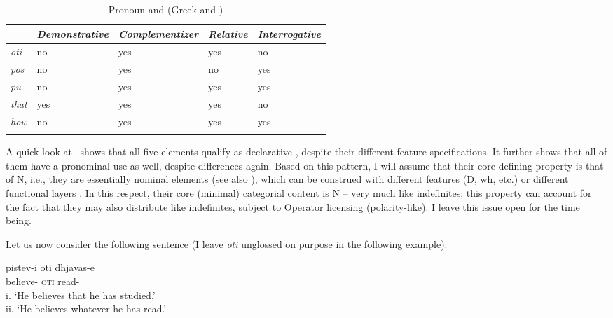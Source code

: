 \documentclass[output=paper]{langsci/langscibook}
\begin{document}
\begin{table}
\begin{tabularx}{\textwidth}{lXXXX}
\lsptoprule
             & \emph{Demonstrative} & \emph{Complementizer} & \emph{Relative} & \emph{Interrogative}\\
\midrule
 \emph{oti}  & no                   & yes                   & yes             & no\\
 \emph{pos}  & no                   & yes                   & no              & yes\\
 \emph{pu}   & no                   & yes                   & yes             & yes\\
 \emph{that} & yes                  & yes                   & yes             & no\\
 \emph{how}  & no                   & yes                   & yes             & yes\\
\lspbottomrule
\end{tabularx}
\caption{Pronoun and  (Greek and )}\label{tab:key:06.1}
\end{table}

A quick look at~ shows that all five elements qualify as
declarative , despite their different feature
specifications. It further shows that all of them have a pronominal use as
well, despite differences again. Based on this pattern, I will assume that
their core defining property is that of N, i.e., they are essentially nominal
elements (see also \citealt{Franco2012}), which can be construed with different
features (D, wh, etc.) or different functional layers \citep{Baunaz2015}. In
this respect, their core (minimal) categorial content
is N – very much like indefinites; this property can account for the fact that
they may also distribute like indefinites, subject to Operator licensing
(polarity-like). I leave this issue open for the time being.

Let us now consider the following sentence (I leave \emph{oti} unglossed on
purpose in the following example):

\ea\label{ex:key:6.9} 
    \sn
    \gll    pistev-i oti dhjavas-e\\
	        believe-\Tsg{} \textsc{oti} read-\Tsg{}\\
	\glt    i.  \enquote*{He believes that he has studied.}\\
            ii.  \enquote*{He believes whatever he has read.}
\z
\end{document}
